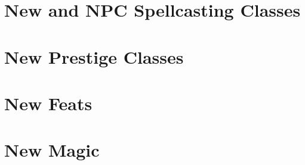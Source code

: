 \section{New and NPC Spellcasting Classes}

 \newpage
\section{New Prestige Classes}
 \newpage
\section{New Feats}

\section{New Magic}
